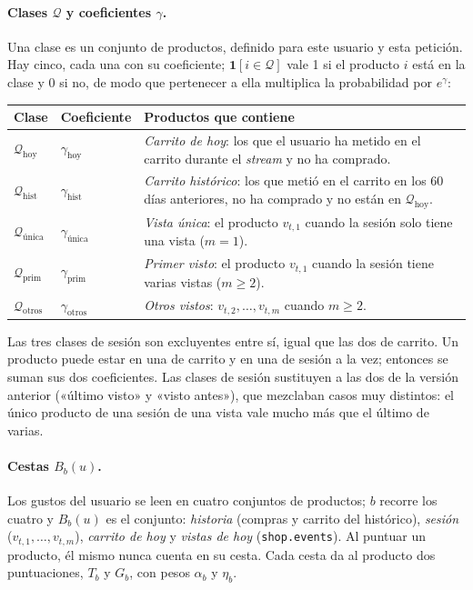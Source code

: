 \documentclass[11pt,a4paper]{article}
\newcommand{\cod}[1]{\texttt{#1}}
\begin{document}
\paragraph{Clases $\mathcal Q$ y coeficientes $\gamma$.} Una clase es un conjunto de productos, definido
para este usuario y esta petición. Hay cinco, cada una con su coeficiente; $\mathbf 1[i\in\mathcal Q]$
vale 1 si el producto $i$ está en la clase y 0 si no, de modo que pertenecer a ella multiplica la
probabilidad por $e^{\gamma}$:

\begin{center}
\begin{tabular}{llp{9.0cm}}
\toprule
Clase & Coeficiente & Productos que contiene\\
\midrule
$\mathcal Q_{\text{hoy}}$ & $\gamma_{\text{hoy}}$ & \emph{Carrito de hoy}: los que el usuario ha metido en el carrito durante el \emph{stream} y no ha comprado.\\
$\mathcal Q_{\text{hist}}$ & $\gamma_{\text{hist}}$ & \emph{Carrito histórico}: los que metió en el carrito en los 60 días anteriores, no ha comprado y no están en $\mathcal Q_{\text{hoy}}$.\\
$\mathcal Q_{\text{única}}$ & $\gamma_{\text{única}}$ & \emph{Vista única}: el producto $v_{t,1}$ cuando la sesión solo tiene una vista ($m=1$).\\
$\mathcal Q_{\text{prim}}$ & $\gamma_{\text{prim}}$ & \emph{Primer visto}: el producto $v_{t,1}$ cuando la sesión tiene varias vistas ($m\ge2$).\\
$\mathcal Q_{\text{otros}}$ & $\gamma_{\text{otros}}$ & \emph{Otros vistos}: $v_{t,2},\dots,v_{t,m}$ cuando $m\ge2$.\\
\bottomrule
\end{tabular}
\end{center}

Las tres clases de sesión son excluyentes entre sí, igual que las dos de carrito. Un producto puede estar
en una de carrito y en una de sesión a la vez; entonces se suman sus dos coeficientes. Las clases de
sesión sustituyen a las dos de la versión anterior («último visto» y «visto antes»), que mezclaban casos
muy distintos: el único producto de una sesión de una vista vale mucho más que el último de varias.

\paragraph{Cestas $B_b(u)$.} Los gustos del usuario se leen en cuatro conjuntos de productos; $b$
recorre los cuatro y $B_b(u)$ es el conjunto: \emph{historia} (compras y carrito del histórico),
\emph{sesión} ($v_{t,1},\dots,v_{t,m}$), \emph{carrito de hoy} y \emph{vistas de hoy}
(\cod{shop.events}). Al puntuar un producto, él mismo nunca cuenta en su cesta. Cada cesta da al producto
dos puntuaciones, $T_b$ y $G_b$, con pesos $\alpha_b$ y $\eta_b$.
\end{document}
